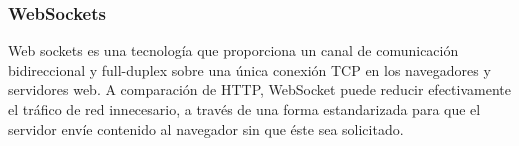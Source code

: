 \subsubsection{WebSockets}
Web sockets es una tecnología que proporciona un canal de comunicación bidireccional y full-duplex sobre una única conexión TCP en los navegadores y servidores web. A comparación de HTTP, WebSocket puede reducir efectivamente el tráfico de red innecesario, a través de una forma estandarizada para que el servidor envíe contenido al navegador sin que éste sea solicitado.\cite{cheng_new_2013}











